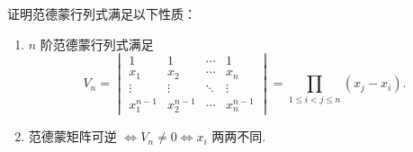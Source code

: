\begin{example}{}{}
    证明范德蒙行列式满足以下性质：
    \begin{enumerate}
        \item $n$ 阶范德蒙行列式满足
            \[
                V_n=\begin{vmatrix}
                    1         & 1         & \cdots & 1         \\
                    x_1       & x_2       & \cdots & x_n       \\
                    \vdots    & \vdots    & \ddots & \vdots    \\
                    x_1^{n-1} & x_2^{n-1} & \cdots & x_n^{n-1}
                \end{vmatrix}=\prod_{1 \leqslant i < j \leqslant n}(x_j-x_i).
            \]
        \item 范德蒙矩阵可逆 $\iff V_n \neq 0 \iff x_i$ 两两不同.
    \end{enumerate}
\end{example}


